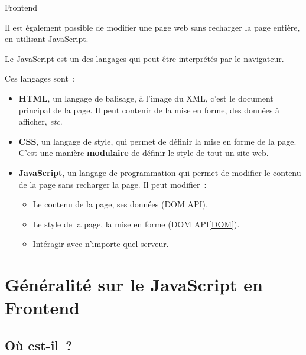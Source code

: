 \documentclass{beamer}
\begin{document}
    \begin{frame}{Frontend}
        \begin{small}
            Il est également possible de modifier une page web sans recharger la page entière, en utilisant JavaScript.

            Le JavaScript est un des langages qui peut être interprétés par le navigateur.

            Ces langages sont~:
            \begin{itemize}
                \item \textbf{HTML}, un langage de balisage, à l'image du XML, c'est le document principal de la page.
                Il peut contenir de la mise en forme, des données à afficher, \textit{etc}.
                \item \textbf{CSS}, un langage de style, qui permet de définir la mise en forme de la page.
                C'est une manière \textbf{modulaire} de définir le style de tout un site web.
                \item \textbf{JavaScript}, un langage de programmation qui permet de modifier le contenu de la page sans recharger la page.
                Il peut modifier~:
                \begin{itemize}
                    \item Le contenu de la page, ses données (DOM API\footnotemark{}).
                    \item Le style de la page, la mise en forme (DOM API\cref{DOM}).
                    \item Intéragir avec n'importe quel serveur.
                \end{itemize}
            \end{itemize}
        \end{small}
    \end{frame}


    \section{Généralité sur le JavaScript en Frontend}\label{sec:js-basic}

    \subsection{Où est-il~?}\label{sec:where}
\end{document}
